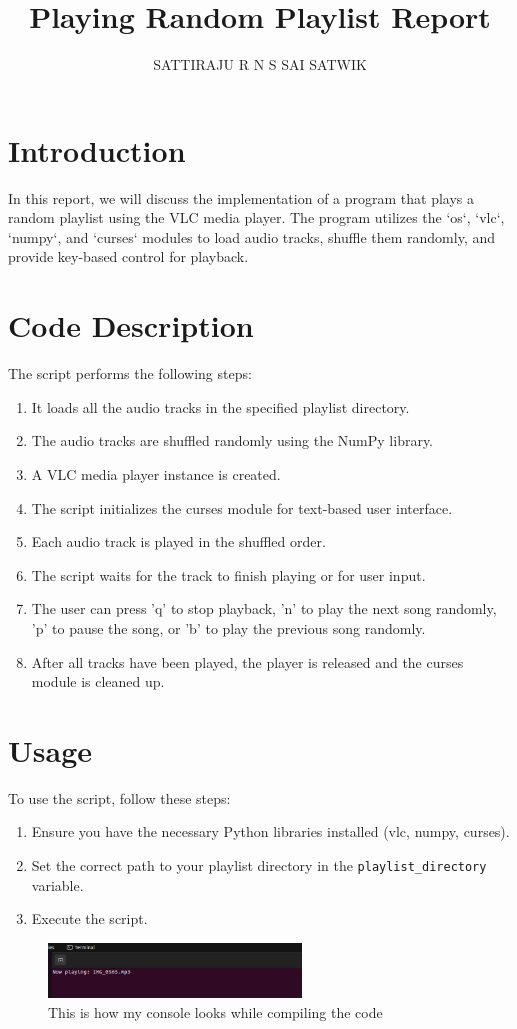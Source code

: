 \documentclass{article}
\begin{document}
\title{Playing Random Playlist Report}
\author{SATTIRAJU R N S SAI SATWIK}
\maketitle

\section{Introduction}
In this report, we will discuss the implementation of a program that plays a random playlist using the VLC media player. The program utilizes the `os`, `vlc`, `numpy`, and `curses` modules to load audio tracks, shuffle them randomly, and provide key-based control for playback.


\section{Code Description}

The script performs the following steps:

\begin{enumerate}
  \item It loads all the audio tracks in the specified playlist directory.
  \item The audio tracks are shuffled randomly using the NumPy library.
  \item A VLC media player instance is created.
  \item The script initializes the curses module for text-based user interface.
  \item Each audio track is played in the shuffled order.
  \item The script waits for the track to finish playing or for user input.
  \item The user can press 'q' to stop playback, 'n' to play the next song randomly, 'p' to pause the song, or 'b' to play the previous song randomly.
  \item After all tracks have been played, the player is released and the curses module is cleaned up.
\end{enumerate}

\section{Usage}

To use the script, follow these steps:

\begin{enumerate}
  \item Ensure you have the necessary Python libraries installed (vlc, numpy, curses).
  \item Set the correct path to your playlist directory in the \texttt{playlist\_directory} variable.
  \item Execute the script.
\end{enumerate}



\begin{figure}[htbp]
  \centering
  \includegraphics[width=0.6\textwidth]{Screenshot from 2023-05-18 18-05-33.png}
  \caption{This is how my console looks while compiling the code}
  \label{fig:example_image}
\end{figure}
\end{document}
